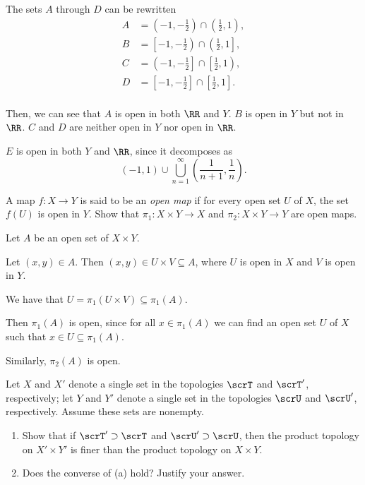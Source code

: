 \documentclass{article}
\begin{document}
The sets $A$ through $D$ can be rewritten
\begin{align*}
    A &= \left(-1, -\frac{1}{2}\right) \cap \left(\frac{1}{2}, 1\right), \\
    B &= \left[-1, -\frac{1}{2}\right) \cap \left(\frac{1}{2}, 1\right], \\
    C &= \left(-1, -\frac{1}{2}\right] \cap \left[\frac{1}{2}, 1\right), \\
    D &= \left[-1, -\frac{1}{2}\right] \cap \left[\frac{1}{2}, 1\right]. \\
\end{align*}

Then, we can see that $A$ is open in both $\RR$ and $Y$.
$B$ is open in $Y$ but not in $\RR$.
$C$ and $D$ are neither open in $Y$ nor open in $\RR$.

$E$ is open in both $Y$ and $\RR$, since it decomposes as 
\[
    (-1,1) \cup \bigcup_{n=1}^\infty \left(\frac{1}{n+1},\frac{1}{n}\right).
\]

\begin{exercise}
    A map $f: X \to Y$ is said to be an \textit{open map} if for every open set $U$ of $X$, the set $f(U)$ is open in $Y$.
    Show that $\pi_1: X \times Y \to X$ and $\pi_2: X \times Y \to Y$ are open maps.
\end{exercise}

Let $A$ be an open set of $X \times Y$.

Let $(x,y) \in A$.
Then $(x,y) \in U \times V \subseteq A$, where $U$ is open in $X$ and $V$ is open in $Y$.

We have that $U = \pi_1(U \times V) \subseteq \pi_1(A)$.

Then $\pi_1(A)$ is open, since for all $x \in \pi_1(A)$ we can find an open set $U$ of $X$ such that $x \in U \subseteq \pi_1(A)$.

Similarly, $\pi_2(A)$ is open.

\begin{exercise}
    Let $X$ and $X'$ denote a single set in the topologies $\scrT$ and $\scrT'$, respectively; let $Y$ and $Y'$ denote a single set in the topologies $\scrU$ and $\scrU'$, respectively.
    Assume these sets are nonempty.
    \begin{enumerate}[label=(\alph*)]
        \item 
            Show that if $\scrT' \supset \scrT$ and $\scrU' \supset \scrU$, then the product topology on $X' \times Y'$ is finer than the product topology on $X \times Y$.
        \item 
            Does the converse of (a) hold?
            Justify your answer.
    \end{enumerate}
\end{exercise}
\end{document}
